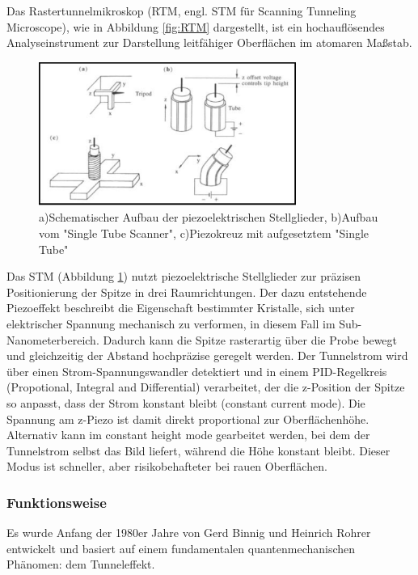Das Rastertunnelmikroskop (RTM, engl. STM für Scanning Tunneling Microscope), wie in Abbildung \ref{fig:RTM} dargestellt, ist ein hochauflösendes Analyseinstrument zur Darstellung leitfähiger Oberflächen im atomaren Maßstab.
\begin{figure}[H]
\centering
\includegraphics[width=0.75\textwidth]{figs/RTM piezo}
\caption{a)Schematischer Aufbau der piezoelektrischen Stellglieder, b)Aufbau vom "Single Tube Scanner", c)Piezokreuz mit aufgesetztem "Single Tube" \cite{piezo}}
\label{fig:piezo}
\end{figure}
Das STM (Abbildung \ref{fig:piezo}) nutzt piezoelektrische Stellglieder zur präzisen Positionierung der Spitze in drei Raumrichtungen. Der dazu entstehende Piezoeffekt beschreibt die Eigenschaft bestimmter Kristalle, sich unter elektrischer Spannung mechanisch zu verformen, in diesem Fall im Sub-Nanometerbereich. Dadurch kann die Spitze rasterartig über die Probe bewegt und gleichzeitig der Abstand hochpräzise geregelt werden. Der Tunnelstrom wird über einen Strom-Spannungswandler detektiert und in einem PID-Regelkreis (Propotional, Integral and Differential) verarbeitet, der die z-Position der Spitze so anpasst, dass der Strom konstant bleibt (constant current mode). Die Spannung am z-Piezo ist damit direkt proportional zur Oberflächenhöhe. Alternativ kann im constant height mode gearbeitet werden, bei dem der Tunnelstrom selbst das Bild liefert, während die Höhe konstant bleibt. Dieser Modus ist schneller, aber risikobehafteter bei rauen Oberflächen.


\subsubsection{Funktionsweise}
Es wurde Anfang der 1980er Jahre von Gerd Binnig und Heinrich Rohrer entwickelt und basiert auf einem fundamentalen quantenmechanischen Phänomen: dem Tunneleffekt.

